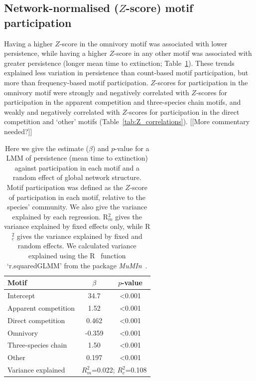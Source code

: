 \documentclass[12pt]{article}
\begin{document}
\begin{spacing}{2.0}
	\subsection*{Network-normalised ($Z$-score) motif participation}

		Having a higher $Z$-score in the omnivory motif was associated with lower persistence, while having a higher $Z$-score in any other motif was associated with greater persistence (longer mean time to extinction; Table~\ref{tab:persistence_Z}).
		These trends explained less variation in persistence than count-based motif participation, but more than frequency-based motif participation.
		$Z$-scores for participation in the omnivory motif were strongly and negatively correlated with $Z$-scores for participation in the apparent competition and three-species chain motifs, and weakly and negatively correlated with $Z$-scores for participation in the direct competition and `other' motifs (Table~\ref{tab:Z_correlations}).
		[[More commentary needed?]]


		\begin{table}[h!]
		\caption{Here we give the estimate ($\beta$) and $p$-value for a LMM of persistence (mean time to extinction) against participation in each motif and a random effect of global network structure.  Motif participation was defined as the $Z$-score of participation in each motif, relative to the species' community. We also give the variance explained by each regression. R$^{2}_{m}$ gives the variance explained by fixed effects only, while R$^{2}_{c}$ gives the variance explained by fixed and random effects. We calculated variance explained using the R~\citep{R} function `r.squaredGLMM' from the package \emph{MuMIn}~\citep{MuMIn}.}
		\label{tab:persistence_Z}
		\begin{tabular}{l | c c}
		 Motif & $\beta$ & $p$-value \\  
		 \hline
		 Intercept & 34.7 & \textless0.001 \\
		 \hline
		 Apparent competition & 1.52 & \textless0.001 \\
		 Direct competition &  0.462  & \textless0.001 \\
		 Omnivory & -0.359  & \textless0.001 \\
		 Three-species chain & 1.50 & \textless0.001 \\
		 Other &  0.197  & \textless0.001 \\
		 \hline
		 Variance explained & \multicolumn{2}{c}{$R^{2}_m$=0.022; $R^{2}_c$=0.108} \\
		 \hline
		 \end{tabular}
		 \end{table}



\end{spacing}
\end{document}
